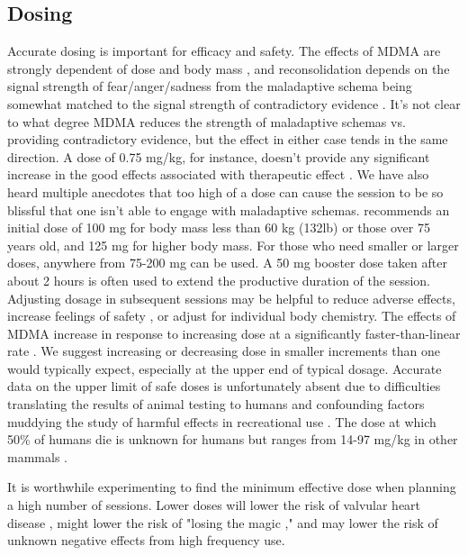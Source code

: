 \documentclass[12pt,letterpaper]{book}
\begin{document}
\subsection*{Dosing}
\label{sec:dosing}
Accurate dosing is important for efficacy and safety. The effects of MDMA are strongly dependent of dose and body mass \cite{studerusResponse}, and reconsolidation depends on the signal strength of fear/anger/sadness from the maladaptive schema being somewhat matched to the signal strength of contradictory evidence \cite{eckerUnlocking}. It's not clear to what degree MDMA reduces the strength of maladaptive schemas vs. providing contradictory evidence, but the effect in either case tends in the same direction. A dose of 0.75 mg/kg, for instance, doesn't provide any significant increase in the good effects associated with therapeutic effect \cite{bediMDMALowDose}. We have also heard multiple anecdotes that too high of a dose can cause the session to be so blissful that one isn't able to engage with maladaptive schemas. \textcite{liechtiInteractions} recommends an initial dose of 100 mg for body mass less than 60 kg (132lb) or those over 75 years old, and 125 mg for higher body mass. For those who need smaller or larger doses, anywhere from 75-200 mg can be used. A 50 mg booster dose taken after about 2 hours is often used to extend the productive duration of the session. Adjusting dosage in subsequent sessions may be helpful to reduce adverse effects, increase feelings of safety \cite{regan2021Connection}, or adjust for individual body chemistry. The effects of MDMA increase in response to increasing dose at a significantly faster-than-linear rate \cite{de2000nonlinear}. We suggest increasing or decreasing dose in smaller increments than one would typically expect, especially at the upper end of typical dosage. Accurate data on the upper limit of safe doses is unfortunately absent due to difficulties translating the results of animal testing to humans and confounding factors muddying the study of harmful effects in recreational use \cite{passieHistory}. The dose at which 50\% of humans die is unknown for humans but ranges from 14-97 mg/kg in other mammals \cite{pharmalaInvestigatorBrochure}.

It is worthwhile experimenting to find the minimum effective dose when planning a high number of sessions. Lower doses will lower the risk of valvular heart disease \cite{droogmans2007valvular,tagen2023valvular}, might lower the risk of "losing the magic \cite{farreTolerance,parrottTolerance}," and may lower the risk of unknown negative effects from high frequency use.
\end{document}

